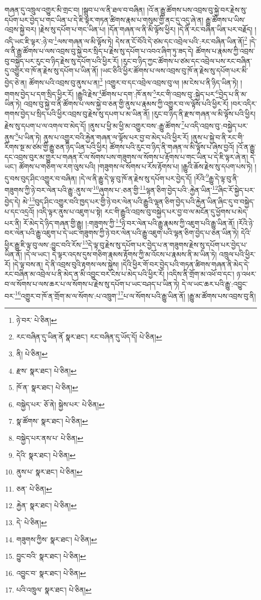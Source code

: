གཞན་དུ་འཁྲུལ་འགྱུར་མི་གྲང་བ། །སྒྲུབ་པ་ལ་ནི་ཐལ་བ་བཞིན། །འོ་ན་རྒྱུ་ཚོགས་པས་འབྲས་བུ་སྐྱེ་བར་རྗེས་སུ་དཔོག་པར་བྱེད་པ་གང་ཡིན་པ་དེ་ཇི་ལྟར་གཏན་ཚིགས་རྣམ་པ་གསུམ་གྱི་ནང་དུ་འདུ་ཞེ་ན། རྒྱུ་ཚོགས་པ་ཡིས་འབྲས་སྐྱེ་བར། །རྗེས་སུ་དཔོག་པ་གང་ཡིན་པ། །དོན་གཞན་ལ་ནི་མི་ལྟོས་ཕྱིར། །དེ་ནི་རང་བཞིན་ཡིན་པར་བརྗོད། །འདི་ཡང་ཇི་ལྟར་:ཉེ་བ་\footnote{ཉེ་བར་  པེ་ཅིན། }ལས་གཞན་ལ་མི་ལྟོས་ཏེ། དེས་ན་ངོ་བོའི་དེ་ཙམ་དང་འབྲེལ་པའི་:རང་བཞིན་ཡིན་ནོ།\footnote{རང་བཞིན་དུ་ཡིན་ནོ  སྣར་ཐང་། རང་བཞིན་དུ་ཡོད་དོ།  པེ་ཅིན། } །དེ་ལ་ནི་རྒྱུ་ཚོགས་པ་ལས་འབྲས་བུ་སྐྱེ་བར་སྲིད་པ་རྗེས་སུ་དཔོག་པ་འབའ་ཞིག་ཏུ་ཟད་དེ། ཚོགས་པ་རྣམས་ཀྱི་འབྲས་བུ་བསྐྱེད་པར་རུང་བ་ཉིད་རྗེས་སུ་དཔོག་པའི་ཕྱིར་རོ། །རུང་བ་ཉིད་ཀྱང་ཚོགས་པ་ཙམ་དང་འབྲེལ་པས་རང་བཞིན་དུ་འགྱུར་བ་ཁོ་ན་རྗེས་སུ་དཔོག་པ་ཡིན་ནོ། །ཡང་ཅིའི་ཕྱིར་ཚོགས་པ་ལས་འབྲས་བུ་ཁོ་ན་རྗེས་སུ་དཔོག་པར་མི་བྱེད་ཅེ་ན། ཚོགས་པའི་འབྲས་བུ་ནུས་པ་ན།\footnote{ནི།  པེ་ཅིན། } །འགྱུར་བ་དང་འབྲེལ་འབྲས་བུ་ལ། །མ་ངེས་པ་ནི་ཉིད་ཡིན་ཏེ། །གགས་བྱེད་པ་དག་སྲིད་ཕྱིར་རོ། །རྒྱུའི་རྗེས་\footnote{རྫས་  སྣར་ཐང་།  པེ་ཅིན། }ཚོགས་པ་དག་:ཁོ་ནས་\footnote{ཁོ་ན་  སྣར་ཐང་།  པེ་ཅིན། }རང་གི་འབྲས་བུ་:སྐྱེད་པར་\footnote{བསྐྱེད་པར་  ཅོ་ནེ། སྐྱེས་པར་  པེ་ཅིན། }བྱེད་པ་ནི་མ་ཡིན་ཏེ། འབྲས་བུ་སྐྱེ་བ་ནི་ཚོགས་པ་ལས་སྐྱེ་བ་ཅན་གྱི་ནུས་པ་རྣམས་ཀྱི་འགྱུར་བ་ལ་ལྟོས་པའི་ཕྱིར་རོ། །བར་འདིར་གགས་བྱེད་པ་སྲིད་པའི་ཕྱིར་འབྲས་བུ་རྗེས་སུ་དཔག་པ་མ་ཡིན་ནོ། །རུང་བ་ཉིད་ནི་རྫས་གཞན་ལ་མི་ལྟོས་པའི་ཕྱིར། རྗེས་སུ་དཔག་པ་ལ་འགལ་བ་མེད་དོ། །ནུས་པ་ཕྱི་མ་ཕྱི་མ་འགྱུར་བས་:རྒྱུ་ཚོགས་\footnote{སྣ་ཚོགས་  སྣར་ཐང་།  པེ་ཅིན། }པ་འདི་འབྲས་བུ་:བསྐྱེད་པར་ནུས་\footnote{བསྐྱེད་པར་ནས་པ་  པེ་ཅིན། }པ་ཡིན་ཏེ། ནུས་པ་འགྱུར་བའི་རྐྱེན་གཞན་ལ་ལྟོས་པར་བྱ་བ་མེད་པའི་ཕྱིར་རོ། །ནུས་པ་སྐྱེ་བ་ནི་རང་གི་རིགས་སྔ་མ་ཙམ་གྱི་རྒྱུ་ཅན་ཉིད་ཡིན་པའི་ཕྱིར། ཚོགས་པའི་རུང་བ་ཉིད་ནི་གཞན་ལ་མི་ལྟོས་པ་ཞེས་བྱའོ། །འོ་ན་རྒྱུ་དང་འབྲས་བུར་མ་གྱུར་པ་གཞན་རོ་ལ་སོགས་པས་གཟུགས་ལ་སོགས་པ་རྟོགས་པ་གང་ཡིན་པ་དེ་ཇི་ལྟར་ཞེ་ན། དེ་ཡང་། ཚོགས་པ་གཅིག་ལ་རག་ལུས་པའི། །གཟུགས་ལ་སོགས་པ་རོས་རྟོགས་པ། །རྒྱུའི་ཆོས་རྗེས་སུ་དཔག་པས་ཏེ། །དུ་བས་བུད་ཤིང་འགྱུར་བ་བཞིན། །དེ་ལ་ནི་རྒྱུ་དེ་ལྟ་བུ་ཁོ་ན་རྗེས་སུ་དཔོག་པར་བྱེད་དོ། །རོའི་\footnote{དེའི་  སྣར་ཐང་།  པེ་ཅིན། }རྒྱུ་དེ་ལྟ་བུ་ནི་གཟུགས་ཀྱི་ཉེ་བར་ལེན་པའི་རྒྱུ་:ནུས་ལ་\footnote{ནུས་པ་  སྣར་ཐང་།  པེ་ཅིན། }ཞུགས་པ་:ཅན་གྱི་\footnote{ཅན་  པེ་ཅིན། }ལྷན་ཅིག་བྱེད་པའི་:རྐྱེན་ཡིན་\footnote{རྐྱེན་  སྣར་ཐང་།  པེ་ཅིན། }ཞིང་རོ་སྐྱེད་པར་བྱེད་དེ། མེ་\footnote{དེ་  པེ་ཅིན། }བུད་ཤིང་འགྱུར་བའི་ཁྱད་པར་གྱི་ཉེ་བར་ལེན་པའི་རྒྱུའི་ལྷན་ཅིག་བྱེད་པའི་རྐྱེན་ཡིན་ཞིང་དུ་བ་བསྐྱེད་པ་དང་འདྲའོ། །འདི་ལྟར་ནུས་པ་འཇུག་པ་སྟེ། རང་གི་རྒྱུའི་འབྲས་བུ་བསྐྱེད་པར་བྱ་བ་ལ་མངོན་དུ་ཕྱོགས་པ་མེད་པར་ནི། རོ་མེད་དེ་ཉིད་གཞན་གྱི་རྒྱུ། །:གཟུགས་ཀྱི་\footnote{གཟུགས་ཀྱིས་  སྣར་ཐང་།  པེ་ཅིན། }ཉེ་བར་ལེན་པའི་རྒྱུ་རྣམས་ཀྱི་འཇུག་པའི་རྒྱུ་ཡིན་ནོ། །རོའི་ཉེ་བར་ལེན་པའི་རྒྱུ་འཇུག་པ་དེ་ཡང་གཟུགས་ཀྱི་ཉེ་བར་ལེན་པའི་རྒྱུ་འཇུག་པའི་ལྷན་ཅིག་བྱེད་པ་ཅན་ཡིན་ཏེ། དེའི་ཕྱིར་རྒྱུ་ཇི་ལྟ་བུ་ལས་:བྱུང་བའི་རོས་\footnote{བྱུང་བའི་  སྣར་ཐང་།  པེ་ཅིན། }དེ་ལྟ་བུ་རྗེས་སུ་དཔོག་པར་བྱེད་པ་ན་གཟུགས་རྗེས་སུ་དཔོག་པར་བྱེད་པ་ཡིན་ནོ། །དེ་ལ་ཡང་། དེ་ལྟར་འདས་དུས་གཅིག་རྣམས་རྟོགས་ཀྱི་མ་འོངས་པ་རྣམས་ནི་མ་ཡིན་ཏེ། འཁྲུལ་པའི་ཕྱིར་རོ། །དེ་ལྟ་བས་ན། དེ་ནི་འབྲས་བུའི་རྟགས་ལས་སྐྱེས། །དེའི་ཕྱིར་གོ་བར་བྱེད་པའི་གཏན་ཚིགས་གཞན་ནི་མེད་དེ་རང་བཞིན་མ་འབྲེལ་པ་ནི་མེད་ན་མི་འབྱུང་བར་ངེས་པ་མེད་པའི་ཕྱིར་རོ། །འདིས་ནི་གྲོག་མ་འཕོ་བ་དང་། ཉ་འཕར་བ་ལ་སོགས་པ་ལས་ཆར་པ་ལ་སོགས་པ་རྗེས་སུ་དཔོག་པ་ཡང་བཤད་པ་ཡིན་ཏེ། དེ་ལ་ཡང་ཆར་པའི་རྒྱུ་:འབྱུང་བར་\footnote{འབྱུང་བ་  སྣར་ཐང་།  པེ་ཅིན། }འགྱུར་བ་ཁོ་ན་གྲོག་མ་ལ་སོགས་:པ་འཁྲུག་\footnote{པའི་འཁྲུལ་  སྣར་ཐང་།  པེ་ཅིན། }པ་ལ་སོགས་པའི་རྒྱུ་ཡིན་ནོ། །རྒྱུ་མ་ཚོགས་པས་འབྲས་བུ་ནི། 